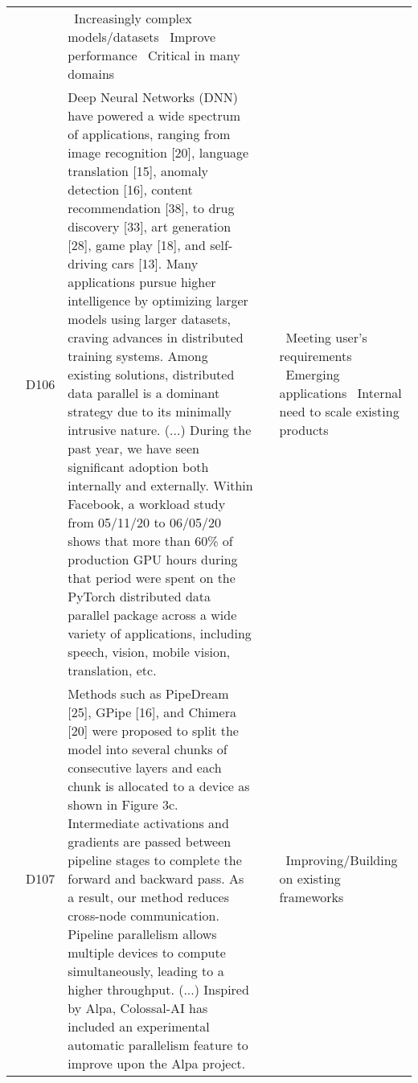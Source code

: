 {\begin{longtable}[H]{|l|p{0.6cm}|p{11.8cm}|p{0.6cm}|p{2cm}|}
	     & \cite{lepikhin_gshard_2020,chen_mxnet_2015, huang_gpipe_2019, shoeybi_megatron-lm_2020}
	     & \textbullet\ Increasingly complex models/datasets \newline \textbullet\ Improve performance \newline \textbullet\ Critical in many domains \\	\cline{2-5}
	     & \label{D106}D106\newline\centering\cite{li_pytorch_2020} & Deep Neural Networks (DNN) have powered a wide spectrum of applications, ranging from image recognition [20], language translation [15], anomaly detection [16], content recommendation [38], to drug discovery [33], art generation [28], game play [18], and self-driving cars [13]. Many applications pursue higher intelligence by optimizing larger models using larger datasets, craving advances in distributed training systems. Among existing solutions, distributed data parallel is a dominant strategy due to its minimally intrusive nature. (...) During the past year, we have seen significant adoption both internally and externally. Within Facebook, a workload study from 05/11/20 to 06/05/20 shows that more than 60\% of production GPU hours during that period were spent on the PyTorch distributed data parallel package across a wide variety of applications, including speech, vision, mobile vision, translation, etc.
	     & \cite{li_pytorch_2020,abadi_tensorflow_2016}
	     & \textbullet\ Meeting user's requirements \newline \textbullet\ Emerging applications \newline \textbullet\ Internal need to scale existing products \\	\cline{2-5}
	     & \label{D107}D107\newline\centering\cite{li_colossal-ai_2023} & Methods such as PipeDream [25], GPipe [16], and Chimera [20] were proposed to split the model into several chunks of consecutive layers and each chunk is allocated to a device as shown in Figure 3c. Intermediate activations and gradients are passed between pipeline stages to complete the forward and backward pass. As a result, our method reduces cross-node communication. Pipeline parallelism allows multiple devices to compute simultaneously, leading to a higher throughput. (...) Inspired by Alpa, Colossal-AI has included an experimental automatic parallelism feature to improve upon the Alpa project.
	     & \cite{li_colossal-ai_2023}
	     & \textbullet\ Improving/Building on existing frameworks \\ \cline{2-5}

\end{longtable}}

